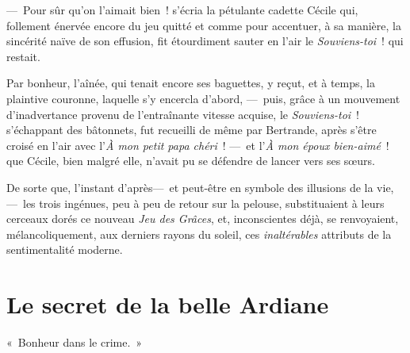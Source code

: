 \documentclass[french,twoside]{book} %
\newcommand{\salute}[1]{\bigbreak{#1}\par\medbreak}
\begin{document}
— Pour sûr qu’on l’aimait bien ! s’écria la pétulante cadette Cécile qui, follement énervée encore du jeu quitté et comme pour accentuer, à sa manière, la sincérité naïve de son effusion, fit étourdiment sauter en l’air le \emph{Souviens-toi} ! qui restait.\par
Par bonheur, l’aînée, qui tenait encore ses baguettes, y reçut, et à temps, la plaintive couronne, laquelle s’y encercla d’abord, — puis, grâce à un mouvement d’inadvertance provenu de l’entraînante vitesse acquise, le \emph{Souviens-toi} ! s’échappant des bâtonnets, fut recueilli de même par Bertrande, après s’être croisé en l’air avec l’\emph{À mon petit papa chéri} ! — et l’\emph{À mon époux bien-aimé} ! que Cécile, bien malgré elle, n’avait pu se défendre de lancer vers ses sœurs.\par
De sorte que, l’instant d’après— et peut-être   en symbole des illusions de la vie, — les trois ingénues, peu à peu de retour sur la pelouse, substituaient à leurs cerceaux dorés ce nouveau \emph{Jeu des Grâces}, et, inconscientes déjà, se renvoyaient, mélancoliquement, aux derniers rayons du soleil, ces \emph{inaltérables} attributs de la sentimentalité moderne.
 \section[{Le secret de la belle Ardiane}]{Le secret de la belle Ardiane}\renewcommand{\leftmark}{Le secret de la belle Ardiane}


\salute{À Monsieur Paul Ginisty}
\noindent « Bonheur dans le crime. »\par
\end{document}
